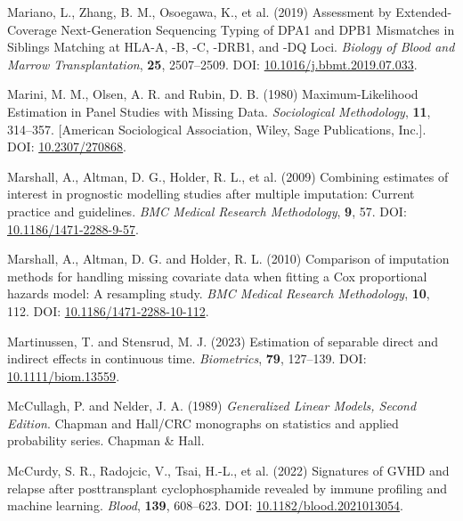 \documentclass[
  letterpaper,
  paper=240mm:170mm,
  twoside=true,
  open=right,
  fontsize=10pt,
  pagesize=false,
  BCOR=15mm,
  DIV=14,
  headinclude=true,
  footinclude=false,
  headsepline=on]{scrbook}
\newlength{\cslhangindent}
\newenvironment{CSLReferences}[2] %
 {\begin{list}{}{%
  \setlength{\itemindent}{0pt}
  \setlength{\leftmargin}{0pt}
  \setlength{\parsep}{0pt}
  \ifodd #1
   \setlength{\leftmargin}{\cslhangindent}
   \setlength{\itemindent}{-1\cslhangindent}
  \fi
  \setlength{\itemsep}{#2\baselineskip}}}
 {\end{list}}
\begin{document}
\begin{CSLReferences}{1}{1}
Mariano, L., Zhang, B. M., Osoegawa, K., et al. (2019) Assessment by
{Extended-Coverage Next-Generation Sequencing Typing} of {DPA1} and
{DPB1 Mismatches} in {Siblings Matching} at {HLA-A}, -{B}, -{C},
-{DRB1}, and -{DQ Loci}. \emph{Biology of Blood and Marrow
Transplantation}, \textbf{25}, 2507--2509. DOI:
\href{https://doi.org/10.1016/j.bbmt.2019.07.033}{10.1016/j.bbmt.2019.07.033}.

Marini, M. M., Olsen, A. R. and Rubin, D. B. (1980) Maximum-{Likelihood
Estimation} in {Panel Studies} with {Missing Data}. \emph{Sociological
Methodology}, \textbf{11}, 314--357. {[}American Sociological
Association, Wiley, Sage Publications, Inc.{]}. DOI:
\href{https://doi.org/10.2307/270868}{10.2307/270868}.

Marshall, A., Altman, D. G., Holder, R. L., et al. (2009) Combining
estimates of interest in prognostic modelling studies after multiple
imputation: Current practice and guidelines. \emph{BMC Medical Research
Methodology}, \textbf{9}, 57. DOI:
\href{https://doi.org/10.1186/1471-2288-9-57}{10.1186/1471-2288-9-57}.

Marshall, A., Altman, D. G. and Holder, R. L. (2010) Comparison of
imputation methods for handling missing covariate data when fitting a
{Cox} proportional hazards model: A resampling study. \emph{BMC Medical
Research Methodology}, \textbf{10}, 112. DOI:
\href{https://doi.org/10.1186/1471-2288-10-112}{10.1186/1471-2288-10-112}.

Martinussen, T. and Stensrud, M. J. (2023) Estimation of separable
direct and indirect effects in continuous time. \emph{Biometrics},
\textbf{79}, 127--139. DOI:
\href{https://doi.org/10.1111/biom.13559}{10.1111/biom.13559}.

McCullagh, P. and Nelder, J. A. (1989) \emph{Generalized Linear Models,
Second Edition}. Chapman and {Hall}/{CRC} monographs on statistics and
applied probability series. Chapman \& Hall.

McCurdy, S. R., Radojcic, V., Tsai, H.-L., et al. (2022) Signatures of
{GVHD} and relapse after posttransplant cyclophosphamide revealed by
immune profiling and machine learning. \emph{Blood}, \textbf{139},
608--623. DOI:
\href{https://doi.org/10.1182/blood.2021013054}{10.1182/blood.2021013054}.


\end{CSLReferences}
\end{document}
